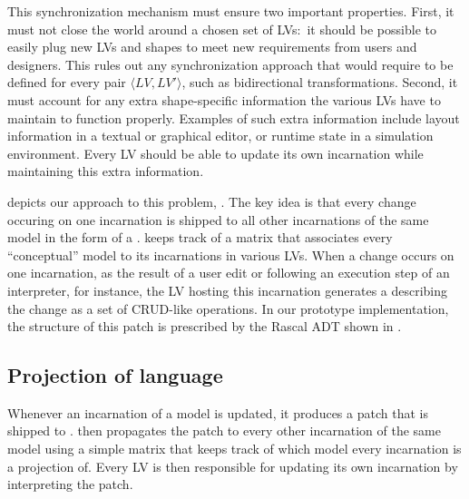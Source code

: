 This synchronization mechanism must ensure two important properties.
First, it must not close the world around a chosen set of LVs:~it should be possible to easily plug new LVs and shapes to meet new requirements from users and designers.
This rules out any synchronization approach that would require to be defined for every pair $\langle LV, LV' \rangle$, such as bidirectional transformations. 
Second, it must account for any extra shape-specific information the various LVs have to maintain to function properly.
Examples of such extra information include layout information in a textual or graphical editor, or runtime state in a simulation environment.
Every LV should be able to update its own incarnation while maintaining this extra information.

 depicts our approach to this problem, \prism.
The key idea is that every change occuring on one incarnation is shipped to all other incarnations of the same model in the form of a \patch.
\prism keeps track of a matrix that associates every ``conceptual'' model to its incarnations in various LVs.
When a change occurs on one incarnation, as the result of a user edit or following an execution step of an interpreter, for instance, the LV hosting this incarnation generates a \patch describing the change as a set of CRUD-like operations.
In our prototype implementation, the structure of this patch is prescribed by the Rascal ADT shown in .

\subsection{Projection of language}
Whenever an incarnation of a model is updated, it produces a patch that is shipped to \prism.
\prism then propagates the patch to every other incarnation of the same model using a simple matrix that keeps track of which model every incarnation is a projection of.
Every LV is then responsible for updating its own incarnation by interpreting the patch.

